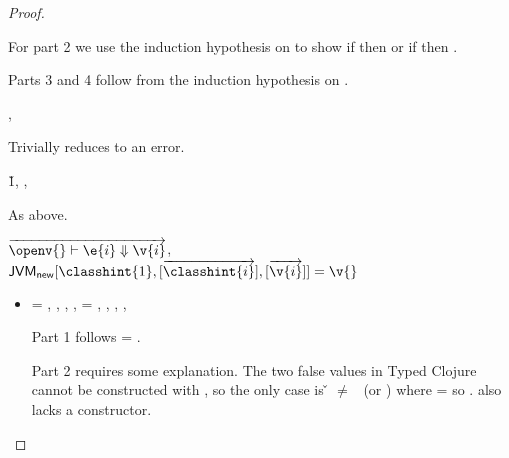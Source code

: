 \begin{lemma}
\begin{proof}
\begin{case}[B-Do]
\begin{itemize}
\begin{subcase}[T-Do]
For part 2 we use the induction hypothesis on 
to show if \istrueval{\v{}} then
        {\satisfies{\openv{}}{\thenprop{\prop{}}}}
        or
  if \isfalseval{\v{}} then
        {\satisfies{\openv{}}{\elseprop{\prop{}}}}.

Parts 3 and 4 follow from the induction hypothesis on .
    \end{subcase}
\end{itemize}
\end{case}

\begin{case}[BE-Do1]
  \opsem {\openv{}} {} {},
  \opsem {\openv{}} {\e{}} {\errorval{\v{}}}

        Trivially reduces to an error.
\end{case}

\begin{case}[BE-Do2]
  \opsem {\openv{}} {} {\v{1}},
  \opsem {\openv{}} {} {\errorvalv{}},
  \opsem {\openv{}} {\e{}} {\errorvalv{}}

        As above.
\end{case}

\begin{case}[B-New]
  $
  \overrightarrow{
  \opsem {\openv{}}
         {\e{i}}
         {\v{i}}
       }$,
         $\newjava {\classhint{1}}
                  {\overrightarrow{\classhint{i}}}
                  {\overrightarrow{\v{i}}}
                  {\v{}}$

\begin{itemize}
  \item[]
\begin{subcase}[T-New]
  \ep{} = {\newexp {\class{}} {}},
  ,
  ,
  ,
  \e{} = { {\classhint{}} 
                                                          {\class{}} {}},
  \issubtypein{}{\javatotcexp{\classhint{}}}{\t{}},
  \inpropenv{\topprop{}}{\thenprop{\prop{}}},
  \inpropenv{\botprop{}}{\elseprop{\prop{}}},
  \issubobjin{}{\emptyobject{}}{\object{}}

Part 1 follows \object{} = \emptyobject{}.

Part 2 requires some explanation. The two false values in Typed Clojure
cannot be constructed with \newliteral{}, so the only case is \v{} $\not=$ \false\ (or \nil)
where \thenprop{\prop{}} = \topprop{} so \satisfies{\openv{}}{\thenprop{\prop{}}}.
\Void{} also lacks a constructor.


\end{subcase}
\end{itemize}
\end{case}
\end{proof}
\end{lemma}
